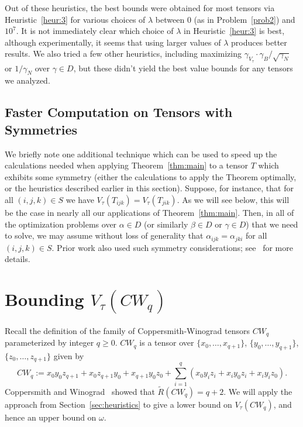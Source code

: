 \PassOptionsToPackage{shortlabels}{enumitem}\documentclass[10pt,a4paper]{article}
\begin{document}
Out of these heuristics, the best bounds were obtained for most tensors via Heuristic~\ref{heur:3} for various choices of $\lambda$ between $0$ (as in Problem~\ref{prob2}) and $10^7$. It is not immediately clear which choice of $\lambda$ in Heuristic~\ref{heur:3} is best, although experimentally, it seems that using larger values of $\lambda$ produces better results. We also tried a few other heuristics, including maximizing $\gamma_{V_\tau} \cdot \gamma_B / \sqrt{\gamma_N}$ or $1/\gamma_N$ over $\gamma \in D$, but these didn't yield the best value bounds for any tensors we analyzed.

\subsection{Faster Computation on Tensors with Symmetries}

We briefly note one additional technique which can be used to speed up the calculations needed when applying Theorem~\ref{thm:main} to a tensor $T$ which exhibits some symmetry (either the calculations to apply the Theorem optimally, or the heuristics described earlier in this section).  Suppose, for instance, that for all $(i,j,k) \in S$ we have $V_\tau(T_{ijk}) = V_\tau(T_{jik})$. As we will see below, this will be the case in nearly all our applications of Theorem~\ref{thm:main}. Then, in all of the optimization problems over $\alpha \in D$ (or similarly $\beta \in D$ or $\gamma \in D$) that we need to solve, we may assume without loss of generality that $\alpha_{ijk} = \alpha_{jki}$ for all $(i,j,k) \in S$. Prior work also used such symmetry considerations; see~\cite{stothers,v12,legall} for more details.


\section{Bounding \texorpdfstring{$V_\tau(CW_q)$}{V(CWq)}} \label{sec:final-answer}
Recall the definition of the family of Coppersmith-Winograd tensors $CW_q$ parameterized by integer $q\geq 0$. $CW_q$ is a tensor over $\{x_0,\ldots,x_{q+1}\}$, $\{y_0, \ldots, y_{q+1}\}$, $\{z_0, \ldots, z_{q+1}\}$ given by $$CW_q := x_0 y_0 z_{q+1} + x_0 z_{q+1} y_0 + x_{q+1} y_0 z_0 + \sum_{i=1}^q (x_0 y_i z_i + x_i y_0 z_i + x_i y_i z_0).$$ 
Coppersmith and Winograd~\cite{coppersmith} showed that $\tilde{R}(CW_q) = q+2$. We will apply the approach from Section~\ref{sec:heuristics} to give a lower bound on $V_\tau(CW_q)$, and hence an upper bound on $\omega$.
\end{document}
